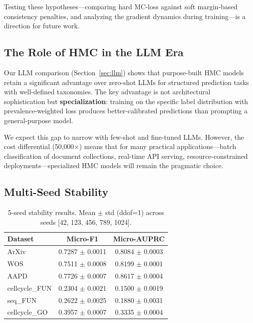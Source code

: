 Testing these hypotheses---comparing hard MC-loss against soft
margin-based consistency penalties, and analyzing the gradient dynamics
during training---is a direction for future work.

\subsection{The Role of HMC in the LLM Era}

Our LLM comparison (Section~\ref{sec:llm}) shows that purpose-built HMC
models retain a significant advantage over zero-shot LLMs for structured
prediction tasks with well-defined taxonomies. The key advantage is not
architectural sophistication but \textbf{specialization}: training on
the specific label distribution with prevalence-weighted loss produces
better-calibrated predictions than prompting a general-purpose model.

We expect this gap to narrow with few-shot and fine-tuned LLMs.
However, the cost differential (50,000$\times$) means that for many
practical applications---batch classification of document collections,
real-time API serving, resource-constrained deployments---specialized
HMC models will remain the pragmatic choice.

\subsection{Multi-Seed Stability}

\begin{table}[H]
\centering
\caption{5-seed stability results. Mean $\pm$ std (ddof=1) across seeds
[42, 123, 456, 789, 1024].}
\label{tab:multiseed}
\begin{tabular}{lcc}
\toprule
\textbf{Dataset} & \textbf{Micro-F1} & \textbf{Micro-AUPRC} \\
\midrule
ArXiv   & 0.7287 $\pm$ 0.0011 & 0.8084 $\pm$ 0.0003 \\
WOS     & 0.7511 $\pm$ 0.0008 & 0.8199 $\pm$ 0.0001 \\
AAPD    & 0.7726 $\pm$ 0.0007 & 0.8617 $\pm$ 0.0004 \\
cellcycle\_FUN & 0.2304 $\pm$ 0.0021 & 0.1500 $\pm$ 0.0019 \\
seq\_FUN       & 0.2622 $\pm$ 0.0025 & 0.1880 $\pm$ 0.0031 \\
cellcycle\_GO  & 0.3957 $\pm$ 0.0007 & 0.3335 $\pm$ 0.0004 \\
\bottomrule
\end{tabular}
\end{table}

